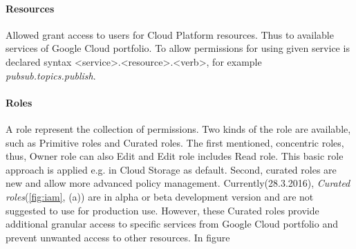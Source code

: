 \documentclass[a4paper,12pt,oneside]{report}
\begin{document}
\paragraph{Resources} Allowed grant access to users for Cloud Platform resources. Thus 
to available services of Google Cloud portfolio. To allow permissions for using given 
service is declared syntax \textless service\textgreater.\textless resource\textgreater.\textless verb\textgreater, for example \emph{pubsub.topics.publish}.

\paragraph{Roles} A role represent the collection of permissions. Two kinds of the role 
are available, such as Primitive roles and Curated roles. The first mentioned, concentric 
roles, thus, Owner role can also Edit and Edit role includes 
Read role. This basic role approach is applied e.g. in Cloud Storage as default. Second, 
curated roles are new and allow more advanced policy management. 
Currently(28.3.2016), \textit{Curated roles}(\ref{fig:iam}, (a)) are in alpha or beta 
development version and are not suggested to use for production 
use. However, these Curated roles provide additional granular access to specific services 
from Google Cloud portfolio and prevent unwanted access to 
other resources. In figure
\end{document}
